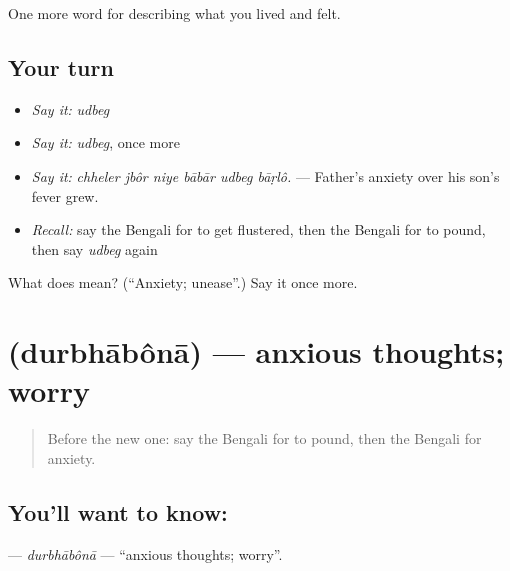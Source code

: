 \begin{grammarlens}[title={What you've built}]
One more word for describing what you lived and felt.
\end{grammarlens}

\subsection*{Your turn}
\begin{itemize}
\raggedright
  \item \emph{Say it:} \emph{udbeg}
  \item \emph{Say it:} \emph{udbeg}, once more
  \item \emph{Say it:} \emph{chheler jbôr niye bābār udbeg bāṛlô.} — Father's anxiety over his son's fever grew.
  \item \emph{Recall:} say the Bengali for to get flustered, then the Bengali for to pound, then say \emph{udbeg} again
\end{itemize}

\begin{tcolorbox}[breakable,colback=teal!4,colframe=teal!35!black,title={Before you move on}]
What does  mean? (\textquotedblleft{}Anxiety; unease\textquotedblright{}.) Say it once more.
\end{tcolorbox}
\section[\texorpdfstring{\bn{দুর্ভাবনা} (durbhābônā)}{দুর্ভাবনা (durbhābônā)}]{ (durbhābônā) — anxious thoughts; worry}

\label{lesson:BN-C442-durbhabona}



\begin{quote}
Before the new one: say the Bengali for to pound, then the Bengali for anxiety.
\end{quote}

\subsection*{You'll want to know: }
\textbf{} — \emph{durbhābônā} — \textquotedblleft{}anxious thoughts; worry\textquotedblright{}.

\begin{quote}
    
\end{quote}

